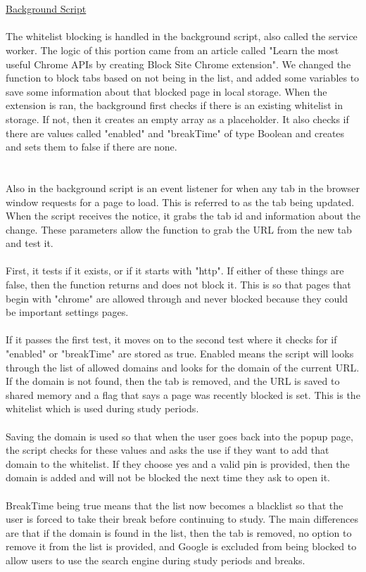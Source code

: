 \documentclass[12pt]{article}
\begin{document}
\\\\
\noindent \underline{Background Script}\\\\
\indent The whitelist blocking is handled in the background script, also called the service worker. The logic of this portion came from an article called "Learn the most useful Chrome APIs by creating Block Site Chrome extension". We changed the function to block tabs based on not being in the list, and added some variables to save some information about that blocked page in local storage.
When the extension is ran, the background first checks if there is an existing whitelist in storage. If not, then it creates an empty array as a placeholder.
It also checks if there are values called "enabled" and "breakTime" of type Boolean and creates and sets them to false if there are none.\\

\\\\Also in the background script is an event listener for when any tab in the browser window requests for a page to load. This is referred to as the tab being updated.
When the script receives the notice, it grabs the tab id and information about the change. These parameters allow the function
to grab the URL from the new tab and test it. \\\\
\indent First, it tests if it exists, or if it starts with "http". If either of these things are false, then the function returns and does not block it.
This is so that pages that begin with "chrome" are allowed through and never blocked because they could be important settings pages.
\\\\\indent If it passes the first test, it moves on to the second test where it checks for if "enabled" or "breakTime" are stored as true. Enabled means the 
script will looks through the list of allowed domains and looks for the domain of the current URL. If the domain is not found, then the tab is removed, and the URL is saved to shared memory and a flag that says a page was recently blocked is set.
This is the whitelist which is used during study periods. 
\\\\\indent Saving the domain is used so that when the user goes back into the popup page, the script checks for these values and asks the use if they want to add that domain to the whitelist. If they choose yes and a valid pin is provided, then the domain
is added and will not be blocked the next time they ask to open it. \\\\
\indent
BreakTime being true means that the list now becomes a blacklist so that the user is forced to take their break before continuing to study. The main differences are that if the domain is found in the list, then the tab is removed, 
no option to remove it from the list is provided, and Google is excluded from being blocked to allow users to use the search engine during study periods and breaks.
\\\\
\end{document}
